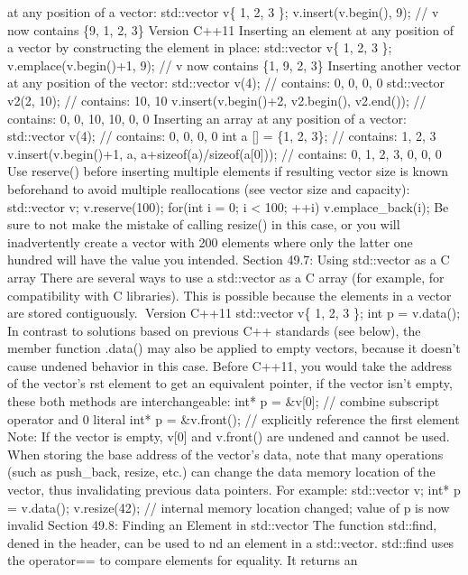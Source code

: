 {at any position of a vector: std::vector v\{ 1, 2, 3 \};
v.insert(v.begin(), 9); // v now contains \{9, 1, 2, 3\} Version C++11
Inserting an element at any position of a vector by constructing the
element in place: std::vector v\{ 1, 2, 3 \}; v.emplace(v.begin()+1, 9);
// v now contains \{1, 9, 2, 3\} Inserting another vector at any
position of the vector: std::vector v(4); // contains: 0, 0, 0, 0
std::vector v2(2, 10); // contains: 10, 10 v.insert(v.begin()+2,
v2.begin(), v2.end()); // contains: 0, 0, 10, 10, 0, 0 Inserting an
array at any position of a vector: std::vector v(4); // contains: 0, 0,
0, 0 int a {[}{]} = \{1, 2, 3\}; // contains: 1, 2, 3
v.insert(v.begin()+1, a, a+sizeof(a)/sizeof(a{[}0{]})); // contains: 0,
1, 2, 3, 0, 0, 0 Use reserve() before inserting multiple elements if
resulting vector size is known beforehand to avoid multiple
reallocations (see vector size and capacity): std::vector v;
v.reserve(100); for(int i = 0; i \textless{} 100; ++i)
v.emplace\_back(i); Be sure to not make the mistake of calling resize()
in this case, or you will inadvertently create a vector with 200
elements where only the latter one hundred will have the value you
intended. Section 49.7: Using std::vector as a C array There are several
ways to use a std::vector as a C array (for example, for compatibility
with C libraries). This is possible because the elements in a vector are
stored contiguously. Version C++11 std::vector v\{ 1, 2, 3 \}; int} p =
v.data(); In contrast to solutions based on previous C++ standards (see
below), the member function .data() may also be applied to empty
vectors, because it doesn't cause undened behavior in this case. Before
C++11, you would take the address of the vector's rst element to get an
equivalent pointer, if the vector isn't empty, these both methods are
interchangeable: int* p = \&v{[}0{]}; // combine subscript operator and
0 literal int* p = \&v.front(); // explicitly reference the first
element Note: If the vector is empty, v{[}0{]} and v.front() are undened
and cannot be used. When storing the base address of the vector's data,
note that many operations (such as push\_back, resize, etc.) can change
the data memory location of the vector, thus invalidating previous data
pointers. For example: std::vector v; int* p = v.data(); v.resize(42);
// internal memory location changed; value of p is now invalid Section
49.8: Finding an Element in std::vector The function std::find, dened in
the header, can be used to nd an element in a std::vector. std::find
uses the operator== to compare elements for equality. It returns an
